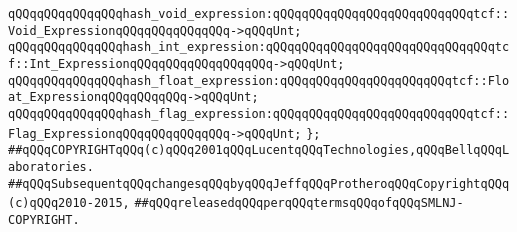 \verb|qQQqqQQqqQQqqQQqhash_void_expression:qQQqqQQqqQQqqQQqqQQqqQQqqQQqtcf::Void_ExpressionqQQqqQQqqQQqqQQq->qQQqUnt;|\newline
\verb|qQQqqQQqqQQqqQQqhash_int_expression:qQQqqQQqqQQqqQQqqQQqqQQqqQQqqQQqtcf::Int_ExpressionqQQqqQQqqQQqqQQqqQQq->qQQqUnt;|\newline
\verb|qQQqqQQqqQQqqQQqhash_float_expression:qQQqqQQqqQQqqQQqqQQqqQQqtcf::Float_ExpressionqQQqqQQqqQQq->qQQqUnt;|\newline
\verb|qQQqqQQqqQQqqQQqhash_flag_expression:qQQqqQQqqQQqqQQqqQQqqQQqqQQqtcf::Flag_ExpressionqQQqqQQqqQQqqQQq->qQQqUnt;|\newline
\verb|};|\newline
\newline
\newline
\verb|##qQQqCOPYRIGHTqQQq(c)qQQq2001qQQqLucentqQQqTechnologies,qQQqBellqQQqLaboratories.|\newline
\verb|##qQQqSubsequentqQQqchangesqQQqbyqQQqJeffqQQqProtheroqQQqCopyrightqQQq(c)qQQq2010-2015,|\newline
\verb|##qQQqreleasedqQQqperqQQqtermsqQQqofqQQqSMLNJ-COPYRIGHT.|\newline

